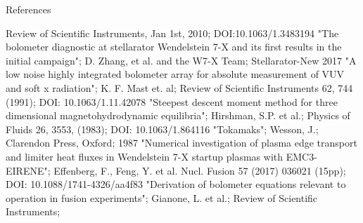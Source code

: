 \documentclass[final]{beamer}
\begin{document}
\begin{frame}
\begin{minipage}[t]{0.30\textwidth}
\begin{kasten}{\large%
                References}
{\begin{thebibliography}{}
                        Review of Scientific Instruments, %
                        Jan 1st, 2010; DOI:10.1063/1.3483194
                        "The bolometer diagnostic at stellarator %
                        Wendelstein 7-X and its first results in the %
                        initial campaign"; D. Zhang, et al. %
                        and the W7-X Team; Stellarator-New 2017
                        "A low noise highly integrated bolometer array %
                        for absolute measurement of VUV and soft x %
                        radiation"; K. F. Mast et. al; %
                        Review of Scientific Instruments 62, 744 (1991);
                        DOI: 10.1063/1.11.42078%
                        "Steepest descent moment method for three %
                        dimensional magnetohydrodynamic equilibria"; %
                        Hirshman, S.P. et al.; %
                        Physics of Fluids 26, 3553, (1983); %
                        DOI: 10.1063/1.864116%
                        "Tokamaks"; Wesson, J.; Clarendon Press, Oxford; 1987%
                        "Numerical investigation of plasma edge %
                        transport and limiter heat fluxes in %
                        Wendelstein 7-X startup plasmas with %
                        EMC3-EIRENE"; %
                        Effenberg, F., Feng, Y. et al. %
                        Nucl. Fusion 57 (2017) 036021 (15pp); %
                        DOI: 10.1088/1741-4326/aa4f83%
                        "Derivation of bolometer equations relevant to %
                        operation in fusion experiments"; %
                        Gianone, L. et al.; Review of Scientific Instruments; %

\end{thebibliography}}
\end{kasten}
\end{minipage}
\end{frame}
\end{document}
